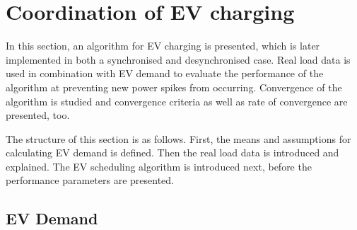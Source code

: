 \section{Coordination of EV charging}
\label{ch3:sec:ev-coordination}

In this section, an algorithm for EV charging is presented, which is later implemented in both a synchronised and desynchronised case.
Real load data is used in combination with EV demand to evaluate the performance of the algorithm at preventing new power spikes from occurring.
Convergence of the algorithm is studied and convergence criteria as well as rate of convergence are presented, too.

The structure of this section is as follows.
First, the means and assumptions for calculating EV demand is defined.
Then the real load data is introduced and explained.
The EV scheduling algorithm is introduced next, before the performance parameters are presented.

\subsection{EV Demand}




